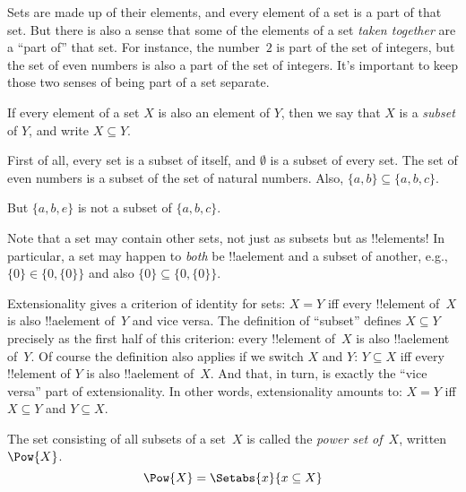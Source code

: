 \documentclass[../../../include/open-logic-section]{subfiles}
\begin{document}

\begin{explain}
Sets are made up of their elements, and every element of a set is a
part of that set. But there is also a sense that some of the elements
of a set \emph{taken together} are a ``part of'' that set. For
instance, the number~$2$ is part of the set of integers, but the set
of even numbers is also a part of the set of integers. It's important
to keep those two senses of being part of a set separate.
\end{explain}

\begin{defn}
If every element of a set $X$ is also an element of
    $Y$, then we say that $X$ is a \emph{subset} of $Y$, and write $X
    \subseteq Y$.
\end{defn}

\begin{ex}
First of all, every set is a subset of itself, and $\emptyset$ is a
subset of every set. The set of even numbers is a subset of the set of
natural numbers. Also, $\{ a, b \} \subseteq \{ a, b, c \}$.

But $\{ a, b, e \}$ is not a subset of $\{ a, b, c \}$.
\end{ex}

\begin{explain}
Note that a set may contain other sets, not just as subsets but as
!!{element}s!{} In particular, a set may happen to \emph{both} be 
!!a{element} and a subset of another, e.g., $\{0\} \in \{0, \{0\}\}$
and also $\{0\} \subseteq \{0, \{0\}\}$.
\end{explain}

\begin{explain}
Extensionality gives a criterion of identity for sets: $X = Y$ iff
every !!{element} of~$X$ is also !!a{element} of~$Y$ and vice versa.
The definition of ``subset'' defines $X \subseteq Y$ precisely as the first
half of this criterion: every !!{element} of~$X$ is also !!a{element}
of~$Y$.  Of course the definition also applies if we switch $X$ and
$Y$: $Y \subseteq X$ iff every !!{element} of $Y$ is also !!a{element}
of~$X$.  And that, in turn, is exactly the ``vice versa'' part of
extensionality.  In other words, extensionality amounts to: $X = Y$
iff $X \subseteq Y$ and $Y \subseteq X$.
\end{explain}

\begin{defn}
The set consisting of all subsets of a set~$X$ is called the
\emph{power set of}~$X$, written $\Pow{X}$.
    \[\Pow{X} = \Setabs{x}{x \subseteq X} \]
\end{defn}
\end{document}
